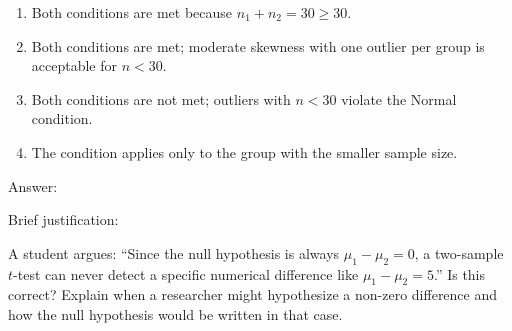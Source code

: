 \documentclass[10pt]{article}
\begin{document}
\begin{enumerate}
\begin{enumerate}[label=(\Alph*)]
  \item Both conditions are met because $n_1 + n_2 = 30 \ge 30$.
  \item Both conditions are met; moderate skewness with one outlier per group is acceptable for $n < 30$.
  \item Both conditions are not met; outliers with $n < 30$ violate the Normal condition.
  \item The condition applies only to the group with the smaller sample size.
\end{enumerate}
\vspace{0.04in}
Answer: \makebox[1.5cm]{\smash{\gradedblank[id=hw4a, type=choice, points=1, answer=C]{0.4in}{0.2in}}}\rule[-0.22in]{0pt}{0.52in}

Brief justification:\par
{}

\end{enumerate}

\begin{extensionbox}
A student argues: ``Since the null hypothesis is always $\mu_1 - \mu_2 = 0$, a two-sample
$t$-test can never detect a specific numerical difference like $\mu_1 - \mu_2 = 5$.''
Is this correct? Explain when a researcher might hypothesize a non-zero difference and
how the null hypothesis would be written in that case.
\end{extensionbox}
\end{document}
